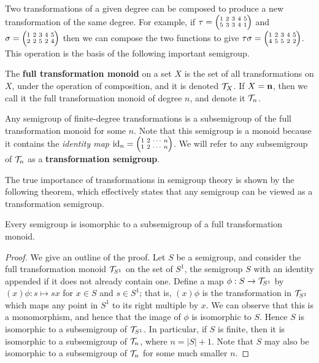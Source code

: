 Two transformations of a given degree can be composed to produce a new
transformation of the same degree.  For example, if $\tau = \transV53341$ and
$\sigma = \transV22524$ then we can compose the two functions to give
$\tau\sigma = \transV45522$.  This operation is the basis of the following
important semigroup.

\begin{definition}
  \label{def:tn}
  The \textbf{full transformation monoid} on a set $X$ is the
  set of all transformations on $X$, under the operation of composition, and it
  is denoted $\mathcal{T}_X$.  If $X = \mathbf{n}$, then we call it the full transformation
  monoid of degree $n$, and denote it $\mathcal{T}_n$.
\end{definition}

Any semigroup of finite-degree transformations is a subsemigroup of the full transformation
monoid for some $n$.  Note that this semigroup is a monoid because it contains
the \textit{identity map} $\id_n = \transN{1}{2}{n}$.  We will refer to any
subsemigroup of $\mathcal{T}_n$ as a \textbf{transformation semigroup}.

The true importance of transformations in semigroup theory is shown by the
following theorem, which effectively states that any semigroup can be viewed as
a transformation semigroup.

\begin{theorem}
  \label{thm:cayley-semigroups}
  Every semigroup is isomorphic to a subsemigroup of a full transformation
  monoid.
  \begin{proof}
    We give an outline of the proof.  Let $S$ be a semigroup, and consider the
    full transformation monoid $\mathcal{T}_{S^1}$ on the set of $S^1$, the semigroup $S$
    with an identity appended if it does not already contain one.  Define a map
    $\phi: S \to \mathcal{T}_{S^1}$ by $(x)\phi: s \mapsto sx$ for $x \in S$ and $s \in S^1$; that is,
    $(x)\phi$ is the transformation in $\mathcal{T}_{S^1}$ which maps any point in
    ${S^1}$ to its right multiple by $x$.  We can observe that this is a
    monomorphism, and hence that the image of $\phi$ is isomorphic to $S$.
    Hence $S$ is isomorphic to a subsemigroup of $\mathcal{T}_{S^1}$.  In particular, if
    $S$ is finite, then it is isomorphic to a subsemigroup of $\mathcal{T}_n$, where $n = |S|+1$.  Note
    that $S$ may also be isomorphic to a subsemigroup of $\mathcal{T}_n$ for some much
    smaller $n$.
  \end{proof}
\end{theorem}

